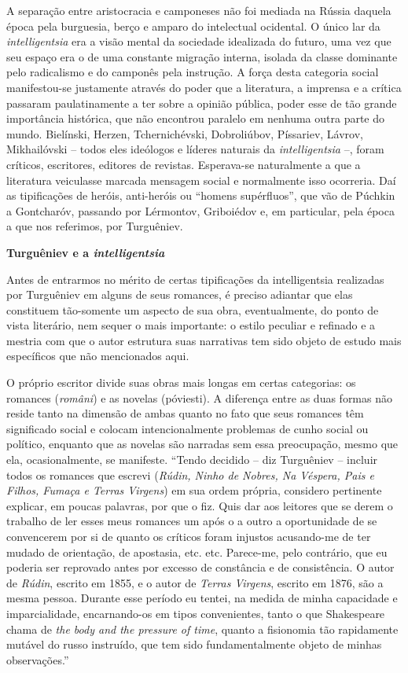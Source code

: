 A separação entre aristocracia e camponeses não foi mediada na Rússia
daquela época pela burguesia, berço e amparo do intelectual ocidental. O
único lar da \emph{intelligentsia} era a visão mental da sociedade
idealizada do futuro, uma vez que seu espaço era o de uma constante
migração interna, isolada da classe dominante pelo radicalismo e do
camponês pela instrução. A força desta categoria social manifestou-se
justamente através do poder que a literatura, a imprensa e a crítica
passaram paulatinamente a ter sobre a opinião pública, poder esse de tão
grande importância histórica, que não encontrou paralelo em nenhuma
outra parte do mundo. Bielínski, Herzen, Tchernichévski, Dobroliúbov,
Píssariev, Lávrov, Mikhailóvski -- todos eles ideólogos e líderes
naturais da \emph{intelligentsia} --, foram críticos, escritores,
editores de revistas. Esperava-se naturalmente a que a literatura
veiculasse marcada mensagem social e normalmente isso ocorreria. Daí as
tipificações de heróis, anti-heróis ou ``homens supérfluos'', que vão de
Púchkin a Gontcharóv, passando por Lérmontov, Griboiédov e, em
particular, pela época a que nos referimos, por Turguêniev.

\textbf{Turguêniev e a \emph{intelligentsia}}

Antes de entrarmos no mérito de certas tipificações da intelligentsia
realizadas por Turguêniev em alguns de seus romances, é preciso adiantar
que elas constituem tão-somente um aspecto de sua obra, eventualmente,
do ponto de vista literário, nem sequer o mais importante: o estilo
peculiar e refinado e a mestria com que o autor estrutura suas
narrativas tem sido objeto de estudo mais específicos que não
mencionados aqui.

O próprio escritor divide suas obras mais longas em certas categorias:
os romances (\emph{români}) e as novelas (póviesti). A diferença entre
as duas formas não reside tanto na dimensão de ambas quanto no fato que
seus romances têm significado social e colocam intencionalmente
problemas de cunho social ou político, enquanto que as novelas são
narradas sem essa preocupação, mesmo que ela, ocasionalmente, se
manifeste. ``Tendo decidido -- diz Turguêniev -- incluir todos os
romances que escrevi (\emph{Rúdin, Ninho de Nobres, Na Véspera, Pais e
Filhos, Fumaça e Terras Virgens}) em sua ordem própria, considero
pertinente explicar, em poucas palavras, por que o fiz. Quis dar aos
leitores que se derem o trabalho de ler esses meus romances um após o a
outro a oportunidade de se convencerem por si de quanto os críticos
foram injustos acusando-me de ter mudado de orientação, de apostasia,
etc. etc. Parece-me, pelo contrário, que eu poderia ser reprovado antes
por excesso de constância e de consistência. O autor de \emph{Rúdin},
escrito em 1855, e o autor de \emph{Terras Virgens}, escrito em 1876,
são a mesma pessoa. Durante esse período eu tentei, na medida de minha
capacidade e imparcialidade, encarnando-os em tipos convenientes, tanto
o que Shakespeare chama de \emph{the body and the pressure of time},
quanto a fisionomia tão rapidamente mutável do russo instruído, que tem
sido fundamentalmente objeto de minhas observações.''


